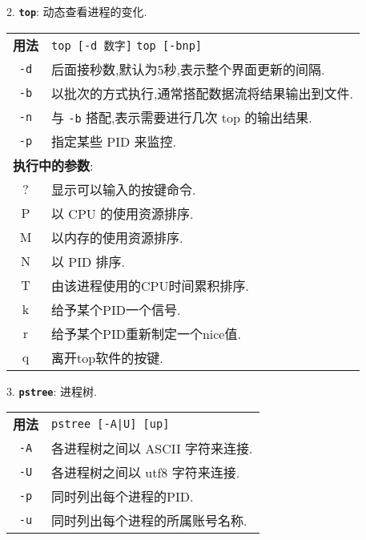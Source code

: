 \par
2. \textbf{\texttt{top}}: 动态查看进程的变化.
\begin{longtable}{c@{ : }p{}}\hline\hline

    \textbf{用法} & \verb"top [-d 数字]"\newline
                    \verb"top [-bnp]" \\

    \texttt{-d} & 后面接秒数,默认为5秒,表示整个界面更新的间隔.\\

    \texttt{-b} & 以批次的方式执行,通常搭配数据流将结果输出到文件.\\

    \texttt{-n} & 与 \texttt{-b} 搭配,表示需要进行几次 top 的输出结果.\\

    \texttt{-p} & 指定某些 PID 来监控. \\

    \multicolumn{2}{l}{\textbf{执行中的参数}:}\\

    ? & 显示可以输入的按键命令. \\

    P & 以 CPU 的使用资源排序. \\

    M & 以内存的使用资源排序. \\

    N & 以 PID 排序. \\

    T & 由该进程使用的CPU时间累积排序. \\

    k & 给予某个PID一个信号. \\

    r & 给予某个PID重新制定一个nice值. \\

    q & 离开top软件的按键.\\

    \hline
\end{longtable}

\par
3. \textbf{\texttt{pstree}}: 进程树.
\begin{longtable}{c@{ : }p{}}\hline\hline

    \textbf{用法} & \verb"pstree [-A|U] [up]"\\

    \texttt{-A} & 各进程树之间以 ASCII 字符来连接.\\

    \texttt{-U} & 各进程树之间以 utf8 字符来连接.\\

    \texttt{-p} & 同时列出每个进程的PID.\\

    \texttt{-u} & 同时列出每个进程的所属账号名称. \\

    \hline
\end{longtable}

